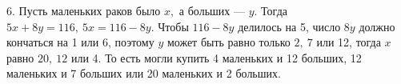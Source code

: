 6. Пусть маленьких раков было $x,$ а больших --- $y.$ Тогда  $5x+8y=116,\ 5x=116-8y.$ Чтобы $116-8y$ делилось на 5, число $8y$ должно кончаться на 1 или 6, поэтому $y$ может быть равно только $2,\ 7$ или 12, тогда $x$ равно $20,\ 12$ или 4. То есть могли купить 4 маленьких и 12 больших, 12 маленьких и 7 больших или 20 маленьких и 2 больших.\\
